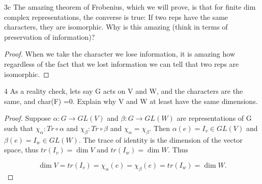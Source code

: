 \documentclass{article}
\begin{document}
\begin{claim}{3c}\label{Claim 3c.}
    The amazing theorem of Frobenius, which we will prove, is that for finite dim complex representations, the converse is true: If two reps have the same characters, they are isomorphic. Why is this amazing (think in terms of preservation of information)?
\end{claim}
\begin{proof}
    When we take the character we lose information, it is amazing how regardless of the fact that we lost information we can tell that two reps are isomorphic.
\end{proof}


\bigskip

\begin{claim}{4}\label{Claim 4.}
    As a reality check, lets say G acts on V and W, and the characters are the same, and char(F) =0. Explain why V and W at least have the same dimensions.
\end{claim}
\begin{proof}
    Suppose $\alpha: G \to GL(V)$ and $\beta: G \to GL(W)$ are representations of G such that $\chi_\alpha : Tr \circ \alpha$ and $\chi_\beta : Tr \circ \beta$ and $\chi_\alpha = \chi_\beta$. Then $\alpha(e) = I_v \in GL(V)$ and $\beta(e) = I_w \in GL(W)$. The trace of identity is the dimension of the vector space, thus $tr(I_v) = \dim V $ and $tr(I_w) = \dim W$. Thus 
    
    \[
        \dim V = tr(I_v) = \chi_\alpha(e) = \chi_\beta(e) = tr(I_w) = \dim W.
    \]
\end{proof}

\bigskip
\end{document}
